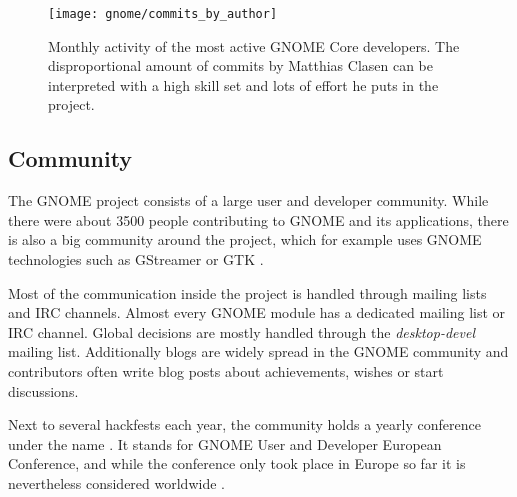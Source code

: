 \begin{figure}[htbp]
  \centering
  \texttt{[image: gnome/commits\_by\_author]}
  \caption[Commits by Most Active Authors, GNOME]
  {Monthly activity of the most active GNOME Core developers. The
    disproportional amount of commits by Matthias Clasen can be interpreted
    with a high skill set and lots of effort he puts in the project.}
\end{figure}


\subsection{Community} %

The GNOME project consists of a large user and developer community. While there
were about 3500 people contributing to GNOME and its applications, there is
also a big community around the project, which for example uses GNOME
technologies such as GStreamer or \ac{GTK} \cite{GNOMEAbout,GNOMETeams}.

Most of the communication inside the project is handled through mailing lists
and \ac{IRC} channels. Almost every GNOME module has a dedicated mailing list
or \ac{IRC} channel. Global decisions are mostly handled through the
\emph{desktop-devel} mailing list. Additionally blogs are widely spread in the
GNOME community and contributors often write blog posts about achievements,
wishes or start discussions.

Next to several hackfests each year, the community holds a yearly conference
under the name . It stands for GNOME User and Developer
European Conference, and while the conference only took place in Europe so far
it is nevertheless considered worldwide \cite{GNOMEGUADEC}.

